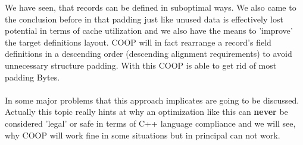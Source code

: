 We have seen, that records can be defined in suboptimal ways. We also came to the conclusion before in  that padding just like unused data is effectively lost potential in terms of cache utilization and we also have the means to 'improve' the target definitions layout. COOP will in fact rearrange a record's field definitions in a descending order (descending alignment requirements) to avoid unnecessary structure padding. With this COOP is able to get rid of most padding Bytes.\\\\
In  some major problems that this approach implicates are going to be discussed. Actually this topic really hints at why an optimization like this can \textbf{never} be considered 'legal' or safe in terms of C++ language compliance and we will see, why COOP will work fine in some situations but in principal can not work.




